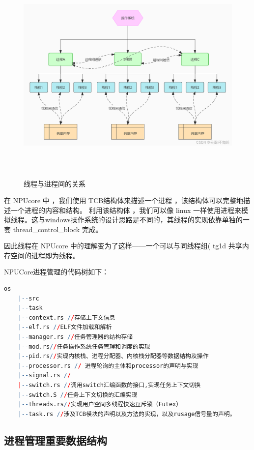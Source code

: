 \begin{figure}[h]
	\centering
	\includegraphics[width=14cm,height=11cm]{figures/04-02-01-线程与进程间的关系.png}
	\caption{线程与进程间的关系}
\end{figure}  

在 NPUcore 中 ，我们使用 TCB结构体来描述一个进程 ，该结构体可以完整地描述一个进程的内容和结构。 利用该结构体 ，我们可以像 linux 一样使用进程来模拟线程。这与windows操作系统的设计思路是不同的，其线程的实现依靠单独的一套 thread\_control\_block 完成。
 
因此线程在 NPUcore 中的理解变为了这样——一个可以与同线程组( tg1d 共享内存空间的进程即为线程。

NPUCore进程管理的代码树如下：
\begin{lstlisting}[language=R]
	os
	|--src
	|--task
	|--context.rs //存储上下文信息
	|--elf.rs //ELF文件加载和解析
	|--manager.rs //任务管理器的结构存储
	|--mod.rs//任务操作系统任务管理和调度的实现
	|--pid.rs//实现内核栈、进程分配器、内核栈分配器等数据结构及操作
	|--processor.rs // 进程轮询的主体和processor的声明与实现
	|--signal.rs //
	|--switch.rs //调用switch汇编函数的接口,实现任务上下文切换
	|--switch.S //任务上下文切换的汇编实现
	|--threads.rs//实现用户空间多线程快速互斥锁（Futex）
	|--task.rs //涉及TCB模块的声明以及方法的实现，以及rusage信号量的声明。
\end{lstlisting}

\subsection{进程管理重要数据结构}
